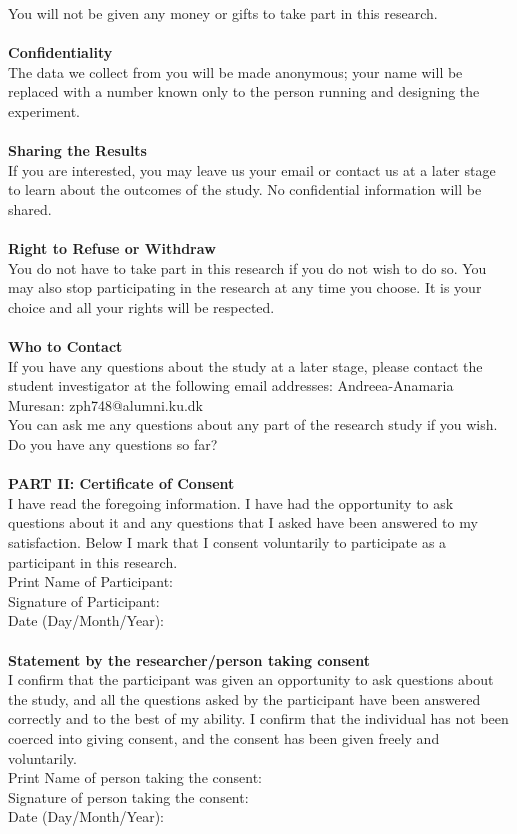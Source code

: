 You will not be given any money or gifts to take part in this research.\\
\\
\textbf{Confidentiality}\\
The data we collect from you will be made anonymous; your name will be replaced with a number known only to the person running and designing the experiment.\\
\\
\textbf{Sharing the Results}\\
If you are interested, you may leave us your email or contact us at a later stage to learn about the outcomes of the study. No confidential information will be shared.\\
\\
\textbf{Right to Refuse or Withdraw}\\
You do not have to take part in this research if you do not wish to do so. You may also stop participating in the research at any time you choose. It is your choice and all your rights will be respected.\\
\\
\textbf{Who to Contact}\\
If you have any questions about the study at a later stage, please contact the student investigator at the following email addresses: 
Andreea-Anamaria Muresan: zph748@alumni.ku.dk\\
You can ask me any questions about any part of the research study if you wish. Do you have any questions so far?\\
\\
\textbf{PART II: Certificate of Consent}\\
I have read the foregoing information. I have had the opportunity to ask questions about it and any questions that I asked have been answered to my satisfaction. Below I mark that I consent voluntarily to participate as a participant in this research. \\
Print Name of Participant: \\
Signature of Participant: \\
Date (Day/Month/Year):    \\
\\
\textbf{Statement by the researcher/person taking consent}\\
I confirm that the participant was given an opportunity to ask questions about the study, and all the questions asked by the participant have been answered correctly and to the best of my ability. I confirm that the individual has not been coerced into giving consent, and the consent has been given freely and voluntarily.\\
Print Name of person taking the consent:  \\ 
Signature of person taking the consent:  \\   
Date (Day/Month/Year):              \\            	
